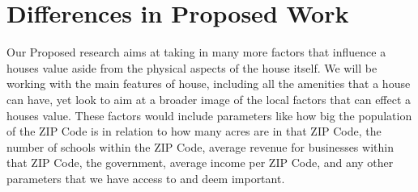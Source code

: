 \section{Differences in Proposed Work}

Our Proposed research aims at taking in many more factors that influence a houses value aside from the physical aspects of the house itself. We will be working with the main features of house, including all the amenities that a house can have, yet look to aim at a broader image of the local factors that can effect a houses value. These factors would include parameters like how big the population of the ZIP Code is in relation to how many acres are in that ZIP Code, the number of schools within the ZIP Code, average revenue for businesses within that ZIP Code, the government, average income per ZIP Code, and any other parameters that we have access to and deem important. 
